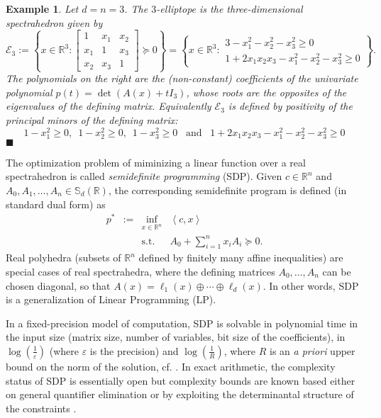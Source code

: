 \documentclass[a4paper,12pt]{article}
\newtheorem{example}[theorem]{Example}
\newcommand{\R}{\mathbb{R}} %
\newcommand{\sym}{\mathbb{S}} %
\newcommand{\exend}{\hfill $\blacksquare$}
\begin{document}
\begin{example}\label{ell3}
  Let $d=n=3$. The $3$-elliptope is the three-dimensional spectrahedron given by
  $$
  \mathcal{E}_3 :=
  \left\{
  x
  \in \R^3 :
  \begin{bmatrix}
    1 & x_1 & x_2 \\
    x_1 & 1 & x_3 \\
    x_2 & x_3 & 1
  \end{bmatrix}
  \succeq 0
  \right\}
  =
  \left\{
  x
  \in \R^3 :
  \begin{array}{r}
    3-x_1^2-x_2^2-x_3^2 \geq 0 \\
    1+2x_1x_2x_3-x_1^2-x_2^2-x_3^2 \geq 0
  \end{array}
  \right\}.
  $$
  The polynomials on the right are the (non-constant) coefficients of the univariate polynomial
  $p(t) = \det(A(x)+t I_3)$,
  whose roots are the opposites of the eigenvalues of the defining matrix. Equivalently $\mathcal{E}_3$
  is defined by positivity of the principal minors of the defining matrix:
  $$
  1-x_1^2 \geq 0, \,\,\, 1-x_2^2 \geq 0, \,\,\, 1-x_3^2 \geq 0 \,\,\, \text{ and } \,\,\, 1+2x_1x_2x_3-x_1^2-x_2^2-x_3^2 \geq 0
  $$
  \exend
\end{example}

The optimization problem of miminizing a linear function over a real spectrahedron is called {\it semidefinite programming} (SDP). Given $c \in \R^n$ and $A_0,A_1,\ldots,A_n \in \sym_d(\R)$, the corresponding semidefinite program is defined (in standard dual form) as
\begin{equation}
  \label{SDP}
\begin{array}{rcll}
  p^* & := & \inf_{x \in \R^n} & \left\langle c, x \right\rangle \\
  &    & \text{s.t.}         & A_0+\sum_{i=1}^n x_i A_i \succeq 0.
\end{array}
\end{equation}
Real polyhedra (subsets of $\R^n$ defined by finitely many affine inequalities) are special cases of real
spectrahedra, where the defining matrices $A_0, \ldots, A_n$ can be chosen diagonal, so that $A(x) =
\ell_1(x) \oplus \cdots \oplus \ell_d(x)$. In other words, SDP is a generalization of Linear Programming (LP).

In a fixed-precision model of computation, SDP is solvable in polynomial time in the input size (matrix size,
number of variables, bit size of the coefficients), in $\log(\frac{1}{\varepsilon})$ (where $\varepsilon$ is the
precision) and $\log(\frac{1}{R})$, where $R$ is an {\it a priori} upper bound on the norm of the solution,
cf. \cite[Sec.1.9]{deKlerk}. In exact arithmetic, the complexity status of SDP is essentially open but complexity
bounds are known based either on general quantifier elimination \cite{ramana1997exact,porkolab1997complexity}
or by exploiting the determinantal structure of the constraints \cite{henrion2016exact}.
\end{document}
